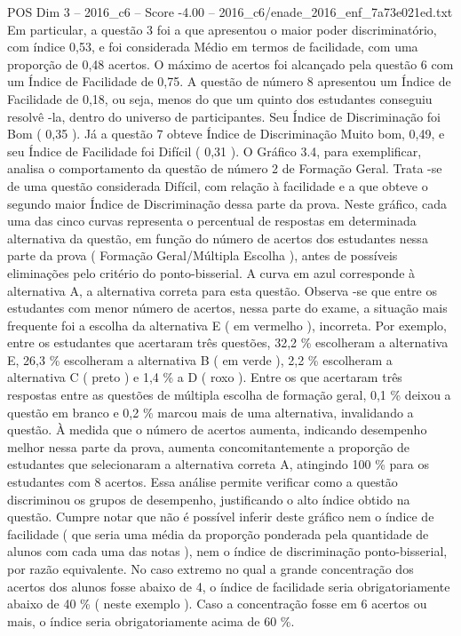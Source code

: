 \begin{textsample}{POS Dim 3 – 2016\_c6 – Score -4.00 – 2016\_c6/enade\_2016\_enf\_7a73e021ed.txt}
Em particular, a questão 3 foi a que apresentou o maior poder discriminatório, com índice 0,53, e foi considerada Médio em termos de facilidade, com uma proporção de 0,48 acertos.
O máximo de acertos foi alcançado pela questão 6 com um Índice de Facilidade de 0,75.
A questão de número 8 apresentou um Índice de Facilidade de 0,18, ou seja, menos do que um quinto dos estudantes conseguiu resolvê -la, dentro do universo de participantes.
Seu Índice de Discriminação foi Bom ( 0,35 ).
Já a questão 7 obteve Índice de Discriminação Muito bom, 0,49, e seu Índice de Facilidade foi Difícil ( 0,31 ).
O Gráfico 3.4, para exemplificar, analisa o comportamento da questão de número 2 de Formação Geral.
Trata -se de uma questão considerada Difícil, com relação à facilidade e a que obteve o segundo maior Índice de Discriminação dessa parte da prova.
Neste gráfico, cada uma das cinco curvas representa o percentual de respostas em determinada alternativa da questão, em função do número de acertos dos estudantes nessa parte da prova ( Formação Geral/Múltipla Escolha ), antes de possíveis eliminações pelo critério do ponto-bisserial.
A curva em azul corresponde à alternativa A, a alternativa correta para esta questão.
Observa -se que entre os estudantes com menor número de acertos, nessa parte do exame, a situação mais frequente foi a escolha da alternativa E ( em vermelho ), incorreta.
Por exemplo, entre os estudantes que acertaram três questões, 32,2 \% escolheram a alternativa E, 26,3 \% escolheram a alternativa B ( em verde ), 2,2 \% escolheram a alternativa C ( preto ) e 1,4 \% a D ( roxo ).
Entre os que acertaram três respostas entre as questões de múltipla escolha de formação geral, 0,1 \% deixou a questão em branco e 0,2 \% marcou mais de uma alternativa, invalidando a questão.
À medida que o número de acertos aumenta, indicando desempenho melhor nessa parte da prova, aumenta concomitantemente a proporção de estudantes que selecionaram a alternativa correta A, atingindo 100 \% para os estudantes com 8 acertos.
Essa análise permite verificar como a questão discriminou os grupos de desempenho, justificando o alto índice obtido na questão.
Cumpre notar que não é possível inferir deste gráfico nem o índice de facilidade ( que seria uma média da proporção ponderada pela quantidade de alunos com cada uma das notas ), nem o índice de discriminação ponto-bisserial, por razão equivalente.
No caso extremo no qual a grande concentração dos acertos dos alunos fosse abaixo de 4, o índice de facilidade seria obrigatoriamente abaixo de 40 \% ( neste exemplo ).
Caso a concentração fosse em 6 acertos ou mais, o índice seria obrigatoriamente acima de 60 \%.

\end{textsample}
